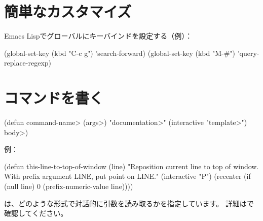 
\section{簡単なカスタマイズ}



Emacs Lispでグローバルにキーバインドを設定する（例）：

\beginexample%
(global-set-key (kbd "C-c g") 'search-forward)
(global-set-key (kbd "M-\#") 'query-replace-regexp)
\endexample

\section{コマンドを書く}

\beginexample%
(defun \<command-name> (\<args>)
  "\<documentation>" (interactive "\<template>")
  \<body>)
\endexample

例：

\beginexample%
(defun this-line-to-top-of-window (line)
  "Reposition current line to top of window.
With prefix argument LINE, put point on LINE."
  (interactive "P")
  (recenter (if (null line)
                0
              (prefix-numeric-value line))))
\endexample

は、どのような形式で対話的に引数を読み取るかを指定しています。
詳細はで確認してください。

\copyrightnotice

\bye

